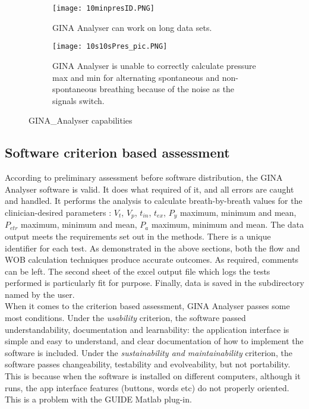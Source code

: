 \documentclass[12pt, openany, oneside]{book}
\begin{document}
\begin{figure}[H]
\centering
	\begin{subfigure}{0.65\textwidth}
		\centering
		\texttt{[image: 10minpresID.PNG]}		
		\caption[GINA Analyser can work on long data sets.] {GINA Analyser can work on long data sets.}
		\label{fig:10min}
	\end{subfigure}
	
	\begin{subfigure}{0.8\textwidth}
		\centering
		\texttt{[image: 10s10sPres\_pic.PNG]}		
		\caption[GINA Analyser calculating pressure max and min for alternating spontaneous and non-spontaneous breathing.]{GINA Analyser is unable to correctly calculate pressure max and min for alternating spontaneous and non-spontaneous breathing because of the noise as the signals switch.}
		\label{fig:10s10s}
	\end{subfigure}

\caption{GINA\_Analyser capabilities}
	
\end{figure}

\subsection{Software criterion based assessment}
According to preliminary assessment before software distribution, the GINA Analyser software is valid. It does what required of it, and all errors are caught and handled. It performs the analysis to calculate breath-by-breath values for the clinician-desired parameters : $V_t$, $V_p$, $t_{in}$, $t_{ex}$, $P_y$ maximum, minimum and mean, $P_{etr}$ maximum, minimum and mean, $P_a$ maximum, minimum and mean. The data output meets the requirements set out in the methods. There is a unique identifier for each test. As demonstrated in the above sections, both the flow and WOB calculation techniques produce accurate outcomes. As required, comments can be left. The second sheet of the excel output file which logs the tests performed is particularly fit for purpose. Finally, data is saved in the subdirectory named by the user. \\

When it comes to the criterion based assessment, GINA Analyser passes some most conditions. Under the \textit{usability} criterion, the software passed understandability, documentation and learnability: the application interface is simple and easy to understand, and clear documentation of how to implement the software is included.  Under the \textit{sustainability and maintainability} criterion, the software passes changeability, testability and evolveability, but not portability. This is because when the software is installed on different computers, although it runs, the app interface features (buttons, words etc) do not properly oriented. This is a problem with the GUIDE Matlab plug-in.
\end{document}
